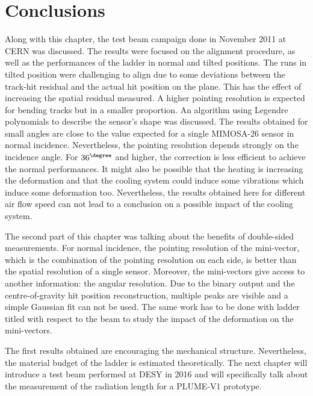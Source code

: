   \section{Conclusions}

  Along with this chapter, the test beam campaign done in November 2011 at CERN was discussed. 
  The results were focused on the alignment procedure, as well as the performances of the ladder in normal and tilted positions.
  The runs in tilted position were challenging to align due to some deviations between the track-hit residual and the actual hit position on the plane.
  This has the effect of increasing the spatial residual measured.
  A higher pointing resolution is expected for bending tracks but in a smaller proportion.
  An algorithm using Legendre polynomials to describe the sensor's shape was discussed.
  The results obtained for small angles are close to the value expected for a single MIMOSA-26 sensor in normal incidence. 
  Nevertheless, the pointing resolution depends strongly on the incidence angle.
  For $36^{\degree}$ and higher, the correction is less efficient to achieve the normal performances.
  It might also be possible that the heating is increasing the deformation and that the cooling system could induce some vibrations which induce some deformation too.
  Nevertheless, the results obtained here for different air flow speed can not lead to a conclusion on a possible impact of the cooling system.

  The second part of this chapter was talking about the benefits of double-sided measurements.
  For normal incidence, the pointing resolution of the mini-vector, which is the combination of the pointing resolution on each side,  is better than the spatial resolution of a single sensor.
  Moreover, the mini-vectors give access to another information: the angular resolution.
  Due to the binary output and the centre-of-gravity hit position reconstruction, multiple peaks are visible and a simple Gaussian fit can not be used. 
  The same work has to be done with ladder titled with respect to the beam to study the impact of the deformation on the mini-vectors.

  The first results obtained are encouraging the mechanical structure.
  Nevertheless, the material budget of the ladder is estimated theoretically.
  The next chapter will introduce a test beam performed at DESY in 2016 and will specifically talk about the measurement of the radiation length for a PLUME-V1 prototype.

